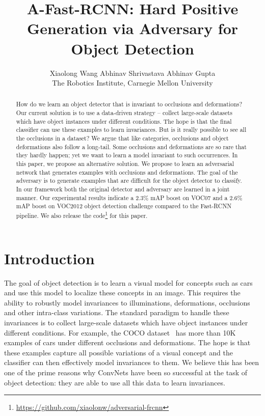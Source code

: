 \documentclass[10pt,twocolumn,letterpaper]{article}
\begin{document}
\title{A-Fast-RCNN: Hard Positive Generation via Adversary for Object Detection}

\author{Xiaolong Wang  \quad     \quad  Abhinav Shrivastava    \quad  \quad  Abhinav Gupta  \\
The Robotics Institute, Carnegie Mellon University \\
}

\maketitle

\begin{abstract}
How do we learn an object detector that is invariant to occlusions and deformations? Our current solution is to use a data-driven strategy -- collect large-scale datasets which have object instances under different conditions. The hope is that the final classifier can use these examples to learn invariances. But is it really possible to see all the occlusions in a dataset? We argue that like categories, occlusions and object deformations also follow a long-tail. Some occlusions and deformations are so rare that they  hardly happen; yet we want to learn a model invariant to such occurrences. In this paper, we propose an alternative solution. We propose to learn an adversarial network that generates examples with occlusions and deformations. The goal of the adversary is to generate examples that are difficult for the object detector to classify. In our framework both the original detector and adversary are learned in a  joint manner. Our experimental results indicate a 2.3\% mAP boost on VOC07 and a 2.6\% mAP boost on VOC2012 object detection challenge compared to the Fast-RCNN pipeline. We also release the  code\footnote{\url{https://github.com/xiaolonw/adversarial-frcnn}} for this paper.  
\end{abstract}


\vspace{-0.1in}
\section{Introduction}
\vspace{-0.05in}
The goal of object detection is to learn a visual model for concepts such as cars and use this model to localize these concepts in an image. This requires the ability to robustly model invariances to illuminations, deformations, occlusions and other intra-class variations. The standard paradigm to handle these invariances is to collect large-scale datasets which have object instances under different conditions. For example, the COCO dataset~\cite{coco} has more than 10K examples of cars under different occlusions and deformations. The hope is that these examples capture all possible variations of a visual concept and the classifier can then effectively model invariances to them. We believe this has been one of the prime reasons why ConvNets have been so successful at the task of object detection: they are able to use all this data to learn invariances.
\end{document}

